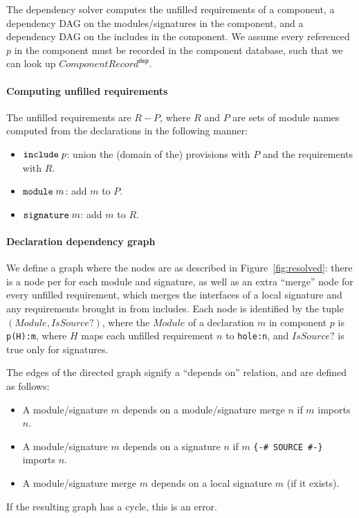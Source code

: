 \documentclass{article}
\newcommand{\I}[1]{\ensuremath{\mathit{#1}}}
\begin{document}
The dependency solver computes the unfilled requirements of a component, a
dependency DAG on the modules/signatures in the component, and a dependency
DAG on the includes in the component.  We assume every referenced $p$ in the
component must be recorded in the component database, such that we can
look up $\I{ComponentRecord}^{\mathsf{dep}}$.

\paragraph{Computing unfilled requirements}  The unfilled requirements are $R-P$, where $R$ and $P$ are sets of module names computed from the declarations in the following manner:

\begin{itemize}
    \item $\verb|include|\; p$: union the (domain of the) provisions with $P$ and the requirements with $R$.
    \item $\verb|module|\; m$: add $m$ to $P$.
    \item $\verb|signature|\; m$: add $m$ to $R$.
\end{itemize}

\paragraph{Declaration dependency graph}
We define a graph where the nodes are as described in Figure~\ref{fig:resolved}:
there is a node per
for each module and signature, as well as an extra ``merge'' node for
every unfilled requirement, which merges the interfaces of a local signature and
any requirements brought in from includes.
%
Each node is identified by the tuple $\left(\I{Module}, \I{IsSource?}\right)$, where
the \I{Module} of a declaration $m$ in component $p$ is \verb|p(H):m|, where $H$ maps
each unfilled requirement $n$ to \verb|hole:n|, and \I{IsSource?} is true only for signatures.

The edges of the directed graph signify a ``depends on'' relation, and are
defined as follows:

\begin{itemize}
    \item A module/signature $m$ depends on a module/signature merge $n$ if $m$ imports $n$.
    \item A module/signature $m$ depends on a signature $n$ if $m$ \verb|{-# SOURCE #-}| imports $n$.
    \item A module/signature merge $m$ depends on a local signature $m$ (if it exists).
\end{itemize}
%
If the resulting graph has a cycle, this is an error.
\end{document}
